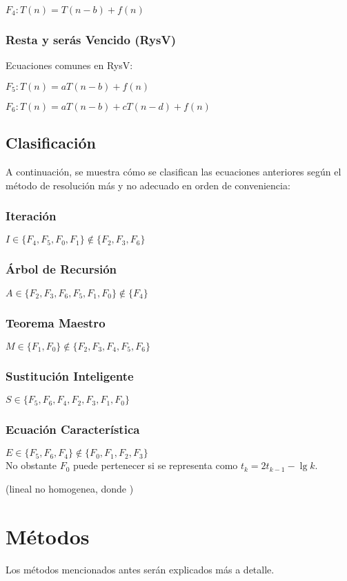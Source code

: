 \( F_4 : T(n) = T(n-b) + f(n) \)

\subsubsection{Resta y serás Vencido (RysV)}
Ecuaciones comunes en RysV:

\( F_5 : T(n) = aT(n-b) + f(n) \)

\( F_6 : T(n) = aT(n-b) + cT(n-d) + f(n) \)

\subsection{Clasificación}
A continuación, se muestra cómo se clasifican las ecuaciones anteriores según el método de resolución más y no adecuado en orden de conveniencia:

\subsubsection{Iteración}
\(  I\in\{F_4, F_5, F_0, F_1\} \not\in\{F_2, F_3, F_6\} \)

\subsubsection{Árbol de Recursión}
\(  A\in\{F_2, F_3, F_6, F_5, F_1, F_0\}\not\in\{F_4\} \)

\subsubsection{Teorema Maestro}
\(  M\in\{F_1, F_0\} \not\in\{F_2, F_3, F_4, F_5, F_6\} \)

\subsubsection{Sustitución Inteligente}
\(  S\in\{F_5, F_6, F_4, F_2, F_3, F_1, F_0\} \)

\subsubsection{Ecuación Característica}
\(  E\in\{F_5, F_6, F_4\}\not\in\{F_0, F_1, F_2, F_3\} \)\\
No obstante $F_0$ puede pertenecer si se representa como $t_k=2t_{k-1}-\lg k$.

(lineal no homogenea, donde )

\section{Métodos}
Los métodos mencionados antes serán explicados más a detalle.

